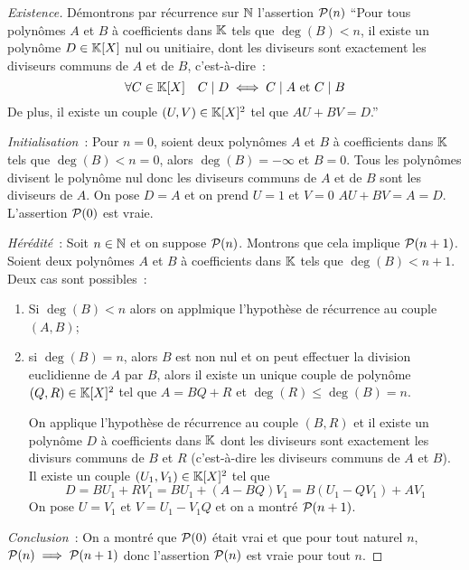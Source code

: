 \begin{proof}[Existence]
  Démontrons par récurrence sur \(\N\) l'assertion \(\P(n)\) ``Pour tous polynômes \(A\) et \(B\) à coefficients dans \(\K\) tels que \(\deg(B)<n\), il existe un polynôme \(D \in \K[X]\)  nul ou unitiaire, dont les diviseurs sont exactement les diviseurs communs de \(A\) et de \(B\), c'est-à-dire~:
  \begin{equation}
    \forall C \in \K[X] \quad C\mid{}D \iff C\mid{}A \text{~et~} C\mid{}B
  \end{equation}
  De plus, il existe un couple \((U,V) \in \K[X]^2\) tel que \(AU+BV=D\).''

  \emph{Initialisation}~: Pour \(n=0\), soient deux polynômes \(A\) et \(B\) à coefficients dans \(\K\) tels que \(\deg(B)<n=0\), alors \(\deg(B)=-\infty\) et \(B=0\). Tous les polynômes divisent le polynôme nul donc les diviseurs communs de \(A\) et de \(B\) sont les diviseurs de \(A\). On pose \(D=A\) et on prend \(U=1\) et \(V=0\) \(AU+BV=A=D\). L'assertion \(\P(0)\) est vraie.

  \emph{Hérédité}~: Soit \(n \in \N\) et on suppose \(\P(n)\). Montrons que cela implique \(\P(n+1)\). Soient deux polynômes \(A\) et \(B\) à coefficients dans \(\K\) tels que \(\deg(B)<n+1\). Deux cas sont possibles~:
  \begin{enumerate}
  \item Si \(\deg(B)<n\) alors on applmique l'hypothèse de récurrence au couple \((A,B)\);
  \item si \(\deg(B)=n\), alors \(B\) est non nul et on peut effectuer la division euclidienne de \(A\) par \(B\), alors il existe un unique couple de polynôme \((Q,R) \in \K[X]^2\) tel que \(A=BQ+R\) et \(\deg(R)\leqslant\deg(B)=n\).

    On applique l'hypothèse de récurrence au couple \((B,R)\) et il existe un polynôme \(D\) à coefficients dans \(\K\) dont les diviseurs sont exactement les divisurs communs de \(B\) et \(R\) (c'est-à-dire les diviseurs communs de \(A\) et \(B\)). Il existe un couple \((U_1,V_1) \in \K[X]^2\) tel que
    \begin{equation}
      D=BU_1+RV_1=BU_1+(A-BQ)V_1=B(U_1-QV_1)+AV_1
    \end{equation}
    On pose \(U=V_1\) et \(V=U_1-V_1Q\) et on a montré \(\P(n+1)\).
  \end{enumerate}
  
  \emph{Conclusion}~: On a montré que \(\P(0)\) était vrai et que pour tout naturel \(n\), \(\P(n)\implies\P(n+1)\) donc l'assertion \(\P(n)\) est vraie pour tout \(n\).
  

\end{proof}
